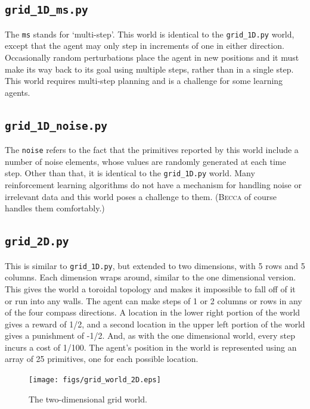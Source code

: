 \subsection{\texttt{grid\_1D\_ms.py}}

The \texttt{ms} stands for `multi-step'. This world is identical to the \texttt{grid\_1D.py} world, except that the agent may only step in increments of one in either direction. Occasionally random perturbations place the agent in new positions and it must make its way back to its goal using multiple steps, rather than in a single step. This world requires multi-step planning and is a challenge for some learning agents.

\subsection{\texttt{grid\_1D\_noise.py}}

The \texttt{noise} refers to the fact that the primitives reported by this world include a number of noise elements, whose values are randomly generated at each time step. Other than that, it is identical to the  \texttt{grid\_1D.py} world. Many reinforcement learning algorithms do not have a mechanism for handling noise or irrelevant data and this world poses a challenge to them. (\textsc{Becca} of course handles them comfortably.)

\subsection{\texttt{grid\_2D.py}}

This is similar to \texttt{grid\_1D.py}, but extended to two dimensions, with 5 rows and 5 columns. Each dimension wraps around, similar to the one dimensional version. This gives the world a toroidal topology and makes it impossible to fall off of it or run into any walls. The agent can make steps of 1 or 2 columns or rows in any of the four compass directions. A location in the lower right portion of the world gives a reward of 1/2, and a second location in the upper left portion of the world gives a punishment of -1/2. And, as with the one dimensional world, every step incurs a cost of 1/100. The agent's position in the world is represented using an array of 25 primitives, one for each possible location. 

\begin{figure}
\centering
\texttt{[image: figs/grid\_world\_2D.eps]}
\caption{The two-dimensional grid world.}
\label{grid_2D}
\end{figure}


